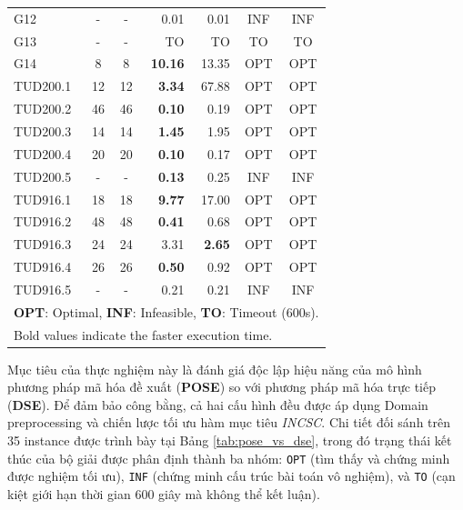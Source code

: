 \documentclass[letterpaper,journal]{IEEEtran}
\begin{document}
\begin{table}[htbp]
\begin{tabular}{l c c r r c c}
G12 & - & - & 0.01 & 0.01 & INF & INF \\
G13 & - & - & TO & TO & TO & TO \\
G14 & 8 & 8 & \textbf{10.16} & 13.35 & OPT & OPT \\
TUD200.1 & 12 & 12 & \textbf{3.34} & 67.88 & OPT & OPT \\
TUD200.2 & 46 & 46 & \textbf{0.10} & 0.19 & OPT & OPT \\
TUD200.3 & 14 & 14 & \textbf{1.45} & 1.95 & OPT & OPT \\
TUD200.4 & 20 & 20 & \textbf{0.10} & 0.17 & OPT & OPT \\
TUD200.5 & - & - & \textbf{0.13} & 0.25 & INF & INF \\
TUD916.1 & 18 & 18 & \textbf{9.77} & 17.00 & OPT & OPT \\
TUD916.2 & 48 & 48 & \textbf{0.41} & 0.68 & OPT & OPT \\
TUD916.3 & 24 & 24 & 3.31 & \textbf{2.65} & OPT & OPT \\
TUD916.4 & 26 & 26 & \textbf{0.50} & 0.92 & OPT & OPT \\
TUD916.5 & - & - & 0.21 & 0.21 & INF & INF \\
\bottomrule
\multicolumn{7}{l}{\footnotesize \textbf{OPT}: Optimal, \textbf{INF}: Infeasible, \textbf{TO}: Timeout (600s).} \\
\multicolumn{7}{l}{\footnotesize Bold values indicate the faster execution time.}
\end{tabular}
\end{table}


Mục tiêu của thực nghiệm này là đánh giá độc lập hiệu năng của mô hình phương pháp mã hóa đề xuất (\textbf{POSE}) so với phương pháp mã hóa trực tiếp (\textbf{DSE}). Để đảm bảo công bằng, cả hai cấu hình đều được áp dụng Domain preprocessing và chiến lược tối ưu hàm mục tiêu \textit{INCSC}. Chi tiết đối sánh trên 35 instance được trình bày tại Bảng \ref{tab:pose_vs_dse}, trong đó trạng thái kết thúc của bộ giải được phân định thành ba nhóm: \texttt{OPT} (tìm thấy và chứng minh được nghiệm tối ưu), \texttt{INF} (chứng minh cấu trúc bài toán vô nghiệm), và \texttt{TO} (cạn kiệt giới hạn thời gian 600 giây mà không thể kết luận).
\end{document}
